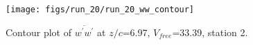 \begin{figure}[H]
\centering
\texttt{[image: figs/run\_20/run\_20\_ww\_contour]}
\caption{Contour plot of $\overline{w^\prime w^\prime}$ at $z/c$=6.97, $V_{free}$=33.39, station 2.}
\label{fig:run_20_ww_contour}
\end{figure}


